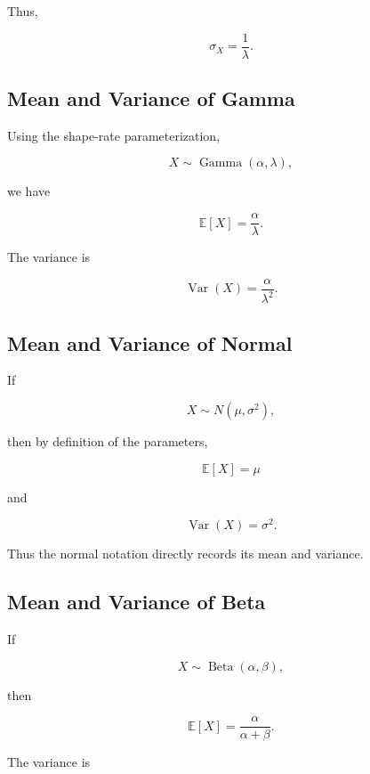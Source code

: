 Thus,

\[
\boxed{
\sigma_X
=
\frac1\lambda.
}
\]

\subsection{Mean and Variance of Gamma}
\label{subsec:gamma-mean-variance}

Using the shape-rate parameterization,

\[
X
\sim
\operatorname{Gamma}(\alpha,\lambda),
\]

we have

\[
\boxed{
\mathbb{E}[X]
=
\frac{\alpha}{\lambda}.
}
\]

The variance is

\[
\boxed{
\operatorname{Var}(X)
=
\frac{\alpha}{\lambda^2}.
}
\]

\subsection{Mean and Variance of Normal}
\label{subsec:normal-mean-variance}

If

\[
X\sim N(\mu,\sigma^2),
\]

then by definition of the parameters,

\[
\boxed{
\mathbb{E}[X]
=
\mu
}
\]

and

\[
\boxed{
\operatorname{Var}(X)
=
\sigma^2.
}
\]

Thus the normal notation directly records its mean and variance.

\subsection{Mean and Variance of Beta}
\label{subsec:beta-mean-variance}

If

\[
X\sim\operatorname{Beta}(\alpha,\beta),
\]

then

\[
\boxed{
\mathbb{E}[X]
=
\frac{\alpha}{\alpha+\beta}.
}
\]

The variance is


